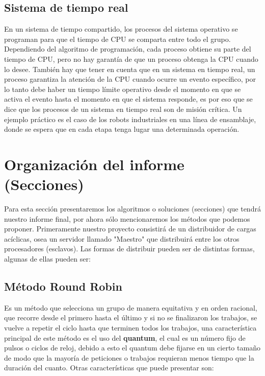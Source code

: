 \documentclass[conference,letterpaper]{IEEEtran}
\begin{document}
\subsection{Sistema de tiempo real}
 En un sistema de tiempo compartido, los procesos del sistema operativo se programan para que el tiempo de CPU se comparta entre todo el grupo. Dependiendo del algoritmo de programación, cada proceso obtiene su parte del tiempo de CPU, pero no hay garantía de que un proceso obtenga la CPU cuando lo desee. También hay que tener en cuenta que en un sistema en tiempo real, un proceso garantiza la atención de la CPU cuando ocurre un evento específico, por lo tanto debe haber un tiempo límite operativo desde el momento en que se activa el evento hasta el momento en que el sistema responde, es por eso que se dice que los procesos de un sistema en tiempo real son de misión crítica. Un ejemplo práctico es el caso de los robots industriales en una línea de ensamblaje, donde se espera que en cada etapa tenga lugar una determinada operación.\\
 
\section{Organizaci\'on del informe (Secciones)}
Para esta sección presentaremos los algoritmos o soluciones (secciones) que tendrá nuestro informe final, por ahora sólo mencionaremos los métodos que podemos proponer. Primeramente nuestro proyecto consistirá de un distribuidor de cargas acíclicas, osea un servidor llamado "Maestro" que distribuirá entre los otros procesadores (esclavos). Las formas de distribuir pueden ser de distintas formas, algunas de ellas pueden ser:

\subsection{M\'etodo Round Robin}
Es un método que selecciona un grupo de manera equitativa y en orden racional, que recorre desde el primero hasta el último y si no se finalizaron los trabajos, se vuelve a repetir el ciclo hasta que terminen todos los trabajos, una característica principal de este m\'etodo es el uso del \textbf{quantum}, el cual es un número fijo de pulsos o ciclos de reloj, debido a esto el quantum debe fijarse en un cierto tamaño de modo que la mayoría de peticiones o trabajos requieran menos tiempo que la duración del cuanto. Otras características que puede presentar son:
\end{document}
